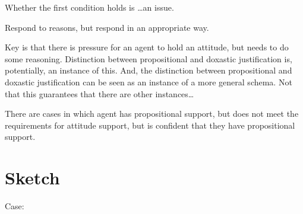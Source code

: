 \documentclass[10pt]{article}
\begin{document}
Whether the first condition holds is \dots an issue.

Respond to reasons, but respond in an appropriate way.

Key is that there is pressure for an agent to hold an attitude, but needs to do some reasoning.
Distinction between propositional and doxastic justification is, potentially, an instance of this.
And, the distinction between propositional and doxastic justification can be seen as an instance of a more general schema.
Not that this guarantees that there are other instances\dots





There are cases in which agent has propositional support, but does not meet the requirements for attitude support, but is confident that they have propositional support.



\newpage

\section{Sketch}
\label{sec:sketch}

Case:
\end{document}
